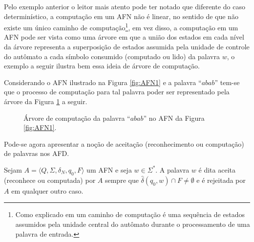 Pelo exemplo anterior o leitor mais atento pode ter notado que diferente do caso determinístico, a computação em um AFN não é linear, no sentido de que não existe um único caminho de computação\footnote{Como explicado em \cite{valdi2020phd} um caminho de computação é uma sequência de estados assumidos pela unidade central do autômato durante o processamento de uma palavra de entrada.}, em vez disso, a computação em um AFN pode ser vista como uma árvore em que a união dos estados em cada nível da árvore representa a superposição de estados assumida pela unidade de controle do autômato a cada símbolo consumido (computado ou lido) da palavra $w$, o exemplo a seguir ilustra bem essa ideia de árvore de computação.

\begin{example}\label{exe:ArvoreComputacaoAFN}
	Considerando o AFN ilustrado na Figura \ref{fig:AFN1} e a palavra ``$abab$'' tem-se que o processo de computação para tal palavra poder ser representado pela árvore da Figura \ref{fig:ArvoreComputacaoAFN} a seguir.
	
	\begin{figure}[h]
		\centering
		\caption{Árvore de computação da palavra ``$abab$'' no AFN da Figura \ref{fig:AFN1}.}
		\label{fig:ArvoreComputacaoAFN}
	\end{figure}
\end{example}

Pode-se agora apresentar a noção de aceitação (reconhecimento ou computação) de palavras nos AFD.

\begin{definition}\label{defi:PalavraAceitaPorAFN}
	Sejam $A = \langle Q, \Sigma, \delta_N, q_0, F\rangle$ um AFN e seja $w \in \Sigma^*$. A palavra $w$ é dita aceita (reconhece ou computada) por $A$ sempre que $\widehat{\delta}(q_0, w) \cap F \neq \emptyset$ e é rejeitada por $A$ em qualquer outro caso.
\end{definition}

